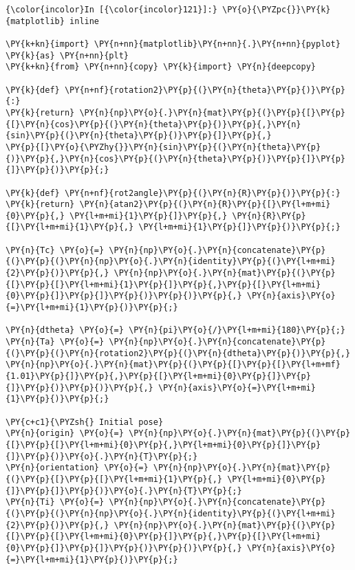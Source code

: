 \documentclass[a4paper]{scrreprt}
\begin{document}
\begin{Verbatim}[commandchars=\\\{\}]
{\color{incolor}In [{\color{incolor}121}]:} \PY{o}{\PYZpc{}}\PY{k}{matplotlib} inline

\PY{k+kn}{import} \PY{n+nn}{matplotlib}\PY{n+nn}{.}\PY{n+nn}{pyplot} \PY{k}{as} \PY{n+nn}{plt}
\PY{k+kn}{from} \PY{n+nn}{copy} \PY{k}{import} \PY{n}{deepcopy} 

\PY{k}{def} \PY{n+nf}{rotation2}\PY{p}{(}\PY{n}{theta}\PY{p}{)}\PY{p}{:} 
\PY{k}{return} \PY{n}{np}\PY{o}{.}\PY{n}{mat}\PY{p}{(}\PY{p}{[}\PY{p}{[}\PY{n}{cos}\PY{p}{(}\PY{n}{theta}\PY{p}{)}\PY{p}{,}\PY{n}{sin}\PY{p}{(}\PY{n}{theta}\PY{p}{)}\PY{p}{]}\PY{p}{,}
\PY{p}{[}\PY{o}{\PYZhy{}}\PY{n}{sin}\PY{p}{(}\PY{n}{theta}\PY{p}{)}\PY{p}{,}\PY{n}{cos}\PY{p}{(}\PY{n}{theta}\PY{p}{)}\PY{p}{]}\PY{p}{]}\PY{p}{)}\PY{p}{;} 

\PY{k}{def} \PY{n+nf}{rot2angle}\PY{p}{(}\PY{n}{R}\PY{p}{)}\PY{p}{:}
\PY{k}{return} \PY{n}{atan2}\PY{p}{(}\PY{n}{R}\PY{p}{[}\PY{l+m+mi}{0}\PY{p}{,} \PY{l+m+mi}{1}\PY{p}{]}\PY{p}{,} \PY{n}{R}\PY{p}{[}\PY{l+m+mi}{1}\PY{p}{,} \PY{l+m+mi}{1}\PY{p}{]}\PY{p}{)}\PY{p}{;} 

\PY{n}{Tc} \PY{o}{=} \PY{n}{np}\PY{o}{.}\PY{n}{concatenate}\PY{p}{(}\PY{p}{(}\PY{n}{np}\PY{o}{.}\PY{n}{identity}\PY{p}{(}\PY{l+m+mi}{2}\PY{p}{)}\PY{p}{,} \PY{n}{np}\PY{o}{.}\PY{n}{mat}\PY{p}{(}\PY{p}{[}\PY{p}{[}\PY{l+m+mi}{1}\PY{p}{]}\PY{p}{,}\PY{p}{[}\PY{l+m+mi}{0}\PY{p}{]}\PY{p}{]}\PY{p}{)}\PY{p}{)}\PY{p}{,} \PY{n}{axis}\PY{o}{=}\PY{l+m+mi}{1}\PY{p}{)}\PY{p}{;} 

\PY{n}{dtheta} \PY{o}{=} \PY{n}{pi}\PY{o}{/}\PY{l+m+mi}{180}\PY{p}{;}
\PY{n}{Ta} \PY{o}{=} \PY{n}{np}\PY{o}{.}\PY{n}{concatenate}\PY{p}{(}\PY{p}{(}\PY{n}{rotation2}\PY{p}{(}\PY{n}{dtheta}\PY{p}{)}\PY{p}{,} \PY{n}{np}\PY{o}{.}\PY{n}{mat}\PY{p}{(}\PY{p}{[}\PY{p}{[}\PY{l+m+mf}{1.01}\PY{p}{]}\PY{p}{,}\PY{p}{[}\PY{l+m+mi}{0}\PY{p}{]}\PY{p}{]}\PY{p}{)}\PY{p}{)}\PY{p}{,} \PY{n}{axis}\PY{o}{=}\PY{l+m+mi}{1}\PY{p}{)}\PY{p}{;} 

\PY{c+c1}{\PYZsh{} Initial pose}
\PY{n}{origin} \PY{o}{=} \PY{n}{np}\PY{o}{.}\PY{n}{mat}\PY{p}{(}\PY{p}{[}\PY{p}{[}\PY{l+m+mi}{0}\PY{p}{,}\PY{l+m+mi}{0}\PY{p}{]}\PY{p}{]}\PY{p}{)}\PY{o}{.}\PY{n}{T}\PY{p}{;}
\PY{n}{orientation} \PY{o}{=} \PY{n}{np}\PY{o}{.}\PY{n}{mat}\PY{p}{(}\PY{p}{[}\PY{p}{[}\PY{l+m+mi}{1}\PY{p}{,} \PY{l+m+mi}{0}\PY{p}{]}\PY{p}{]}\PY{p}{)}\PY{o}{.}\PY{n}{T}\PY{p}{;} 
\PY{n}{Ti} \PY{o}{=} \PY{n}{np}\PY{o}{.}\PY{n}{concatenate}\PY{p}{(}\PY{p}{(}\PY{n}{np}\PY{o}{.}\PY{n}{identity}\PY{p}{(}\PY{l+m+mi}{2}\PY{p}{)}\PY{p}{,} \PY{n}{np}\PY{o}{.}\PY{n}{mat}\PY{p}{(}\PY{p}{[}\PY{p}{[}\PY{l+m+mi}{0}\PY{p}{]}\PY{p}{,}\PY{p}{[}\PY{l+m+mi}{0}\PY{p}{]}\PY{p}{]}\PY{p}{)}\PY{p}{)}\PY{p}{,} \PY{n}{axis}\PY{o}{=}\PY{l+m+mi}{1}\PY{p}{)}\PY{p}{;} 


\end{Verbatim}
\end{document}
